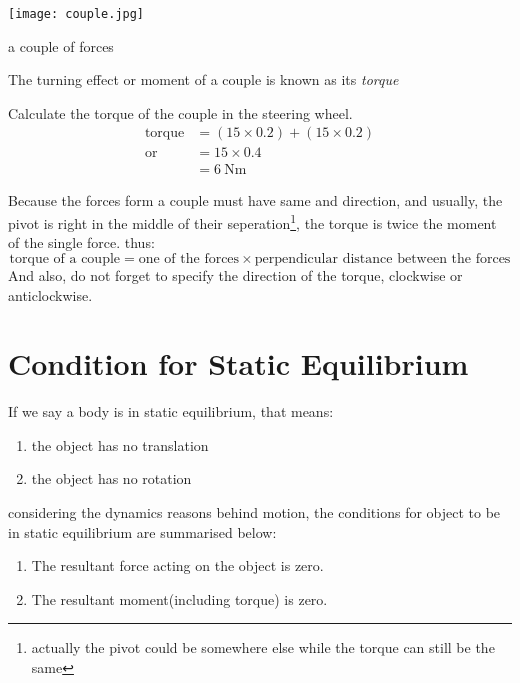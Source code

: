 \documentclass[a4paper]{tufte-handout}
\newenvironment{ExampleBox} %
{\begin{tcolorbox}[breakable,colback=g1!30,colframe=g1,title=Example]} {\end{tcolorbox}}
\begin{document}
\begin{marginfigure}[h]
\texttt{[image: couple.jpg]}
\caption{a couple of forces}
\label{fig:couple}
\end{marginfigure}

The turning effect or moment of a couple is known as its \emph{torque}

\begin{ExampleBox}
Calculate the torque of the couple in the steering wheel.
\tcblower
\begin{align*}
  \text{torque} &= (15\times 0.2)+(15\times0.2)\\
       \text{or}&= 15\times 0.4\\
                &= \SI{6}{\newton\metre}
\end{align*}
\end{ExampleBox}

Because the forces form a couple must have same \uline{\hspace{0.5 in}} and \uline{\hspace{0.5 in}} direction, and usually, the pivot is right in the middle of their seperation\footnote{actually the pivot could be somewhere else while the torque can still be the same}, the torque is twice the moment of the single force. thus:
\[
  \text{torque of a couple} = \text{one of the forces} \times \text{perpendicular distance between the forces}
\]
And also, do not forget to specify the direction of the torque, clockwise or anticlockwise.

\section{Condition for Static Equilibrium}
If we say a body is in static equilibrium, that means:
\begin{enumerate}
  \item the object has no translation
  \item the object has no rotation
\end{enumerate}
considering the dynamics reasons behind motion, the conditions for object to be in static equilibrium are summarised below:
\begin{enumerate}
  \item The resultant force acting on the object is zero.
  \item The resultant moment(including torque) is zero.
\end{enumerate}
\end{document}
